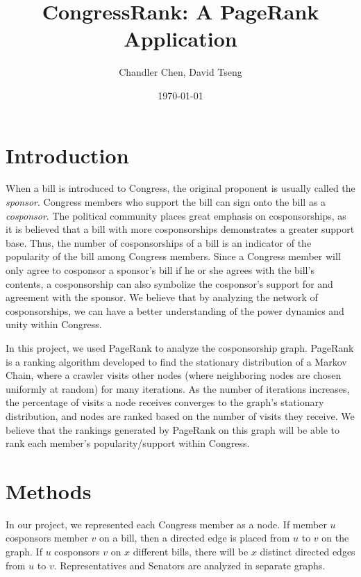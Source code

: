 \documentclass[11pt]{article}
\begin{document}
\title{CongressRank: A PageRank Application}
\author{Chandler Chen, David Tseng}
\date{\today}
\maketitle

\section*{Introduction}
When a bill is introduced to Congress, the original proponent is usually called the \textit{sponsor}. Congress members who support the bill can sign onto the bill as a \textit{cosponsor}. The political community places great emphasis on cosponsorships, as it is believed that a bill with more cosponsorships demonstrates a greater support base. Thus, the number of cosponsorships of a bill is an indicator of the popularity of the bill among Congress members. Since a Congress member will only agree to cosponsor a sponsor's bill if he or she agrees with the bill's contents, a cosponsorship can also symbolize the cosponsor's support for and agreement with the sponsor. We believe that by analyzing the network of cosponsorships, we can have a better understanding of the power dynamics and unity within Congress. 

In this project, we used PageRank to analyze the cosponsorship graph. PageRank is a ranking algorithm developed to find the stationary distribution of a Markov Chain, where a crawler visits other nodes (where neighboring nodes are chosen uniformly at random) for many iterations. As the number of iterations increases, the percentage of visits a node receives converges to the graph's stationary distribution, and nodes are ranked based on the number of visits they receive. We believe that the rankings generated by PageRank on this graph will be able to rank each member's popularity/support within Congress. 




\section*{Methods}
In our project, we represented each Congress member as a node. If member $u$ cosponsors member $v$ on a bill, then a directed edge is placed from $u$ to $v$ on the graph. If $u$ cosponsors $v$ on $x$ different bills, there will be $x$ distinct directed edges from $u$ to $v$. Representatives and Senators are analyzed in separate graphs. 
\end{document}
